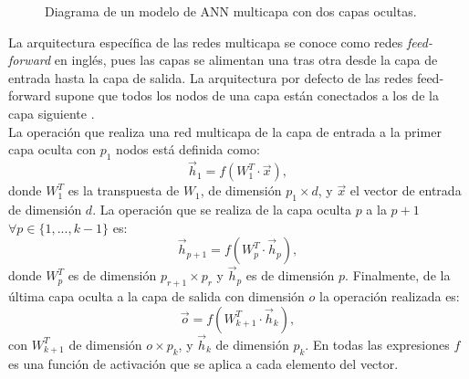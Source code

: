 \begin{figure}[ht]
    \centering
    \caption{Diagrama de un modelo de \acs{ANN} multicapa con dos capas ocultas.}
    \label{fig:nnlayers}
\end{figure}

La arquitectura específica de las redes multicapa se conoce como redes \emph{feed-forward} en inglés, pues las capas se alimentan una tras otra desde la capa de entrada hasta la capa de salida. La arquitectura por defecto de las redes feed-forward supone que todos los nodos de una capa están conectados a los de la capa siguiente \cite{Nielsen:2018}.
\\
La operación que realiza una red multicapa de la capa de entrada a la primer capa oculta con $p_1$ nodos está definida como:
$$\vec{h}_1 = f(W^T_1 \cdot \vec{x}),$$
donde $W^T_1$ es la transpuesta de $W_1$, de dimensión $p_1 \times d$, y $\vec{x}$ el vector de entrada de dimensión $d$. La operación que se realiza de la capa oculta $p$ a la $p+1$ $\forall p \in \{1,...,k-1\}$ es:
$$\vec{h}_{p+1} = f(W^T_{p} \cdot \vec{h}_p),$$
donde $W^T_{p}$ es de dimensión $p_{r+1} \times p_r$ y $\vec{h}_p$ es de dimensión $p$. Finalmente, de la última capa oculta a la capa de salida con dimensión $o$ la operación realizada es:
$$\vec{o} = f(W^T_{k+1} \cdot \vec{h}_k),$$
con $W^T_{k+1}$ de dimensión $o \times p_{k}$, y $\vec{h}_k$ de dimensión $p_k$. En todas las expresiones $f$ es una función de activación que se aplica a cada elemento del vector.

